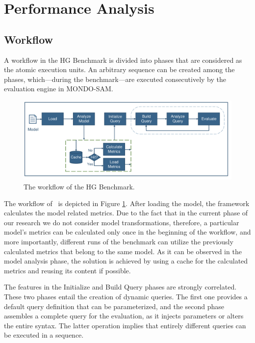 \section{Performance Analysis}

\subsection{Workflow}

A workflow in the HG Benchmark is divided into phases that are considered as the atomic execution units. An arbitrary sequence can be created among the phases, which---during the benchmark---are executed consecutively by the evaluation engine in MONDO-SAM.

\begin{figure}[!ht]
	\centering
	\includegraphics[width=150mm, keepaspectratio]{figures/workflow.pdf}
	\caption{The workflow of the HG Benchmark.}
	\label{fig:mondo_map_workflow}
\end{figure}

The workflow of \framework~is depicted in Figure \ref{fig:mondo_map_workflow}. After loading the model, the framework calculates the model related metrics. Due to the fact that in the current phase of our research we do not consider model transformations, therefore, a particular model's metrics can be calculated only once in the beginning of the workflow, and more importantly, different runs of the benchmark can utilize the previously calculated metrics that belong to the same model. As it can be observed in the model analysis phase, the solution is achieved by using a cache for the calculated metrics and reusing its content if possible.

The features in the \textsf{Initialize} and \textsf{Build Query} phases are strongly correlated. These two phases entail the creation of dynamic queries. The first one provides a default query definition that can be parameterized, and the second phase assembles a complete query for the evaluation, as it injects parameters or alters the entire syntax. The latter operation implies that entirely different queries can be executed in a sequence.

